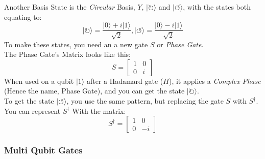 \documentclass[../main.tex]{subfiles}
\begin{document}
Another Basis State is the \emph{Circular} Basis, $Y$,
$\lvert\circlearrowright\rangle$ and $\lvert\circlearrowleft\rangle$, with the
states both equating to:\\
\begin{equation}
	\lvert\circlearrowright\rangle = \frac{\lvert0\rangle +i\lvert1\rangle}{\sqrt{2}}, \lvert\circlearrowleft\rangle = \frac{\lvert0\rangle -i\lvert1\rangle}{\sqrt{2}}
\end{equation}
To make these states, you need an a new gate \(S\) or \emph{Phase
Gate}.\\
The Phase Gate's Matrix looks like this:\\
\begin{equation}
	S = \left[ \begin{matrix} 1 & 0\\0 & i\end{matrix} \right]
\end{equation}
When used on a qubit $\lvert1\rangle$ after a Hadamard gate (\(H\)), it
applies a \emph{Complex Phase} (Hence the name, Phase Gate), and you can
get the state \(\lvert\circlearrowright\rangle\).\\
To get the state \(\lvert\circlearrowleft\rangle\), you use the same pattern,
but replacing the gate \(S\) with \(S^\dagger\).\\
You can represent \(S^\dagger\) With the matrix:\\
\begin{equation}
	S^\dagger = \left[ \begin{matrix} 1 & 0\\0 & -i\end{matrix} \right]
\end{equation}

\subsubsection{Multi Qubit Gates}
\end{document}
